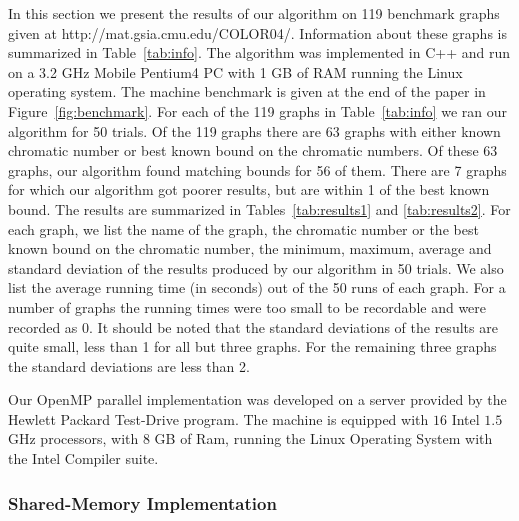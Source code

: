 \documentclass[11pt]{article}
\begin{document}
In this section we present the results of our algorithm on 119 benchmark
graphs given at http://mat.gsia.cmu.edu/COLOR04/.  Information about these
graphs is summarized in Table~\ref{tab:info}.  The algorithm was implemented
in C++ and run on a 3.2 GHz Mobile Pentium4 PC with 1 GB of RAM running the
Linux operating system.  The machine benchmark is given at the end of the
paper in Figure~\ref{fig:benchmark}.  For each of the 119 graphs in
Table~\ref{tab:info} we ran our algorithm for 50 trials.  Of the 119 graphs
there are 63 graphs with either known chromatic number or best known bound on
the chromatic numbers.  Of these 63 graphs, our algorithm found matching
bounds for 56 of them. There are 7 graphs for which our algorithm got poorer
results, but are within 1 of the best known bound.  The results are summarized
in Tables~\ref{tab:results1} and \ref{tab:results2}.  For each graph, we list
the name of the graph, the chromatic number or the best known bound on the
chromatic number, the minimum, maximum, average and standard deviation of the
results produced by our algorithm in 50 trials.  We also list the average
running time (in seconds) out of the 50 runs of each graph.  For a number of
graphs the running times were too small to be recordable and were recorded as
0.  It should be noted that the standard deviations of the results are quite
small, less than 1 for all but three graphs.  For the remaining three graphs
the standard deviations are less than 2.



Our OpenMP parallel implementation was developed on a server provided by the Hewlett Packard Test-Drive program. The machine is equipped with $16$ Intel $1.5$ GHz processors, with $8$ GB of Ram, running the Linux Operating System with the Intel Compiler suite. 

\subsubsection{Shared-Memory Implementation}
\end{document}

